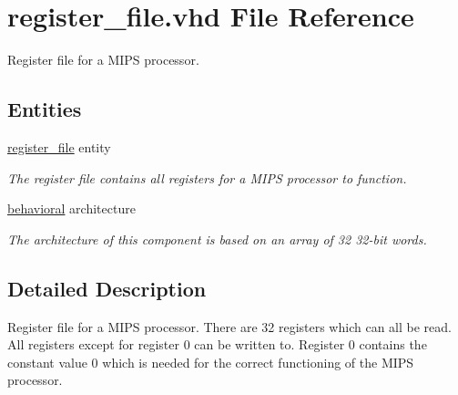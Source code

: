 \hypertarget{register__file_8vhd}{\section{register\-\_\-file.\-vhd \-File \-Reference}
\label{register__file_8vhd}
}


\-Register file for a \-M\-I\-P\-S processor.  


\subsection*{\-Entities}
\begin{DoxyCompactItemize}
\item 
\hyperlink{classregister__file}{register\-\_\-file} entity
\begin{DoxyCompactList}\small\item\em \-The register file contains all registers for a \-M\-I\-P\-S processor to function. \end{DoxyCompactList}\item 
\hyperlink{classregister__file_1_1behavioral}{behavioral} architecture
\begin{DoxyCompactList}\small\item\em \-The architecture of this component is based on an array of 32 32-\/bit words. \end{DoxyCompactList}\end{DoxyCompactItemize}


\subsection{\-Detailed \-Description}
\-Register file for a \-M\-I\-P\-S processor. \-There are 32 registers which can all be read. \-All registers except for register 0 can be written to. \-Register 0 contains the constant value 0 which is needed for the correct functioning of the \-M\-I\-P\-S processor. 